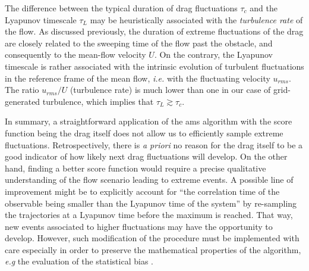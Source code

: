 \documentclass[pre,aps,floatfix,10pt,superscriptaddress, notitlepage,preprint]{revtex4-1}
\begin{document}
The difference between the typical duration of drag fluctuations $\tau_c$ and the Lyapunov timescale $\tau_L$ may be heuristically associated with the \emph{turbulence rate} of the flow.
%
As discussed previously, the duration of extreme fluctuations of the drag are closely related to the sweeping time of the flow past the obstacle, and consequently to the mean-flow velocity $U$. On the contrary, the Lyapunov timescale is rather associated with the intrinsic evolution of turbulent fluctuations in the reference frame of the mean flow, \textit{i.e.} with the fluctuating velocity $u_{rms}$. The ratio $u_{rms}/U$ (turbulence rate) is much lower than one in our case of grid-generated turbulence, which implies that $\tau_L \gtrsim \tau_c$.
 


%
In summary, a straightforward application of the \ac{ams} algorithm with the score function being the drag itself does not allow us to efficiently sample extreme fluctuations.
%
Retrospectively, there is \textit{a priori} no reason for the drag itself to be a good indicator of how likely next drag fluctuations will develop.
On the other hand, finding a better score function would require a precise qualitative understanding of the flow scenario leading to extreme events.
%
%
A possible line of improvement might be to explicitly account for ``the correlation time of the observable being smaller than the Lyapunov time of the system'' by re-sampling the trajectories at a Lyapunov time {before} the maximum is reached. That way, new events associated to higher fluctuations may have the opportunity to develop.
However, such modification of the procedure must be implemented with care especially in order to preserve the mathematical properties of the algorithm, \emph{e.g} the evaluation of the statistical bias .
% 
\end{document}
